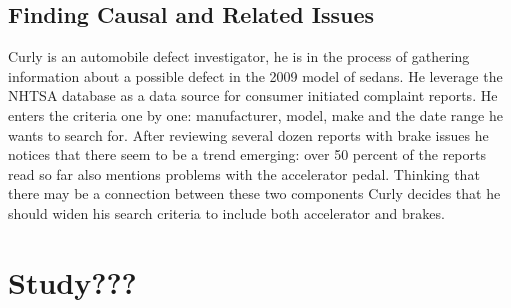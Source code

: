 \subsection{Finding Causal and Related Issues}
Curly is an automobile defect investigator, he is in the process of gathering
information about a possible defect in the 2009 model of sedans. He leverage the
NHTSA database as a data source for consumer initiated complaint reports. He
enters the criteria one by one: manufacturer, model, make and the date range he
wants to search for. After reviewing several dozen reports with brake issues he
notices that there seem to be a trend emerging: over 50 percent of the reports
read so far also mentions problems with the accelerator pedal. Thinking that
there may be a connection between these two components Curly decides that he
should widen his search criteria to include both accelerator and brakes.

\section{Study???}